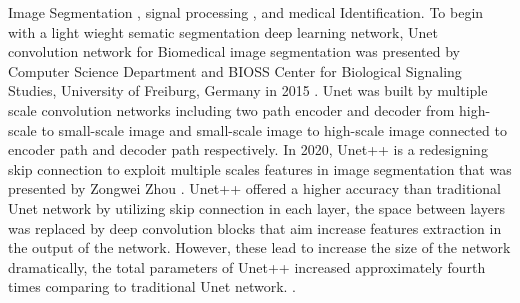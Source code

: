 \documentclass[journal]{IEEEtran} %
\begin{document}
Image Segmentation \cite{b5}, signal processing \cite{b1} \cite{b2}, and medical Identification. To begin with a light wieght sematic segmentation deep learning network, Unet convolution network for Biomedical image segmentation was presented by Computer Science Department and BIOSS Center for Biological Signaling Studies, University of Freiburg, Germany in 2015 \cite{b5}. Unet was built by multiple scale convolution networks including two path encoder and decoder from high-scale to small-scale image and small-scale image to high-scale image connected to encoder path and decoder path respectively. In 2020, Unet++ is a redesigning skip connection to exploit multiple scales features in image segmentation that was presented by Zongwei Zhou \cite{b6}. Unet++ offered a higher accuracy than traditional Unet network by utilizing skip connection in each layer, the space between layers was replaced by deep convolution blocks that aim increase features extraction in the output of the network. However, these lead to increase the size of the network dramatically, the total parameters of Unet++ increased approximately fourth times comparing to traditional Unet network. \cite{b6}.
\\
\indent
\end{document}
